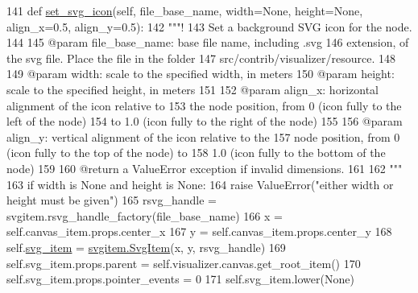 \begin{DoxyCode}
141     \textcolor{keyword}{def }\hyperlink{classvisualizer_1_1core_1_1Node_a308c7317a292873bfeb648b1ca1a839e}{set\_svg\_icon}(self, file\_base\_name, width=None, height=None, align\_x=0.5, align\_y=0.5):
142         \textcolor{stringliteral}{"""!}
143 \textcolor{stringliteral}{        Set a background SVG icon for the node.}
144 \textcolor{stringliteral}{}
145 \textcolor{stringliteral}{        @param file\_base\_name: base file name, including .svg}
146 \textcolor{stringliteral}{        extension, of the svg file.  Place the file in the folder}
147 \textcolor{stringliteral}{        src/contrib/visualizer/resource.}
148 \textcolor{stringliteral}{        }
149 \textcolor{stringliteral}{        @param width: scale to the specified width, in meters}
150 \textcolor{stringliteral}{        @param height: scale to the specified height, in meters}
151 \textcolor{stringliteral}{}
152 \textcolor{stringliteral}{        @param align\_x: horizontal alignment of the icon relative to}
153 \textcolor{stringliteral}{        the node position, from 0 (icon fully to the left of the node)}
154 \textcolor{stringliteral}{        to 1.0 (icon fully to the right of the node)}
155 \textcolor{stringliteral}{}
156 \textcolor{stringliteral}{        @param align\_y: vertical alignment of the icon relative to the}
157 \textcolor{stringliteral}{        node position, from 0 (icon fully to the top of the node) to}
158 \textcolor{stringliteral}{        1.0 (icon fully to the bottom of the node)}
159 \textcolor{stringliteral}{}
160 \textcolor{stringliteral}{        @return a ValueError exception if invalid dimensions.}
161 \textcolor{stringliteral}{}
162 \textcolor{stringliteral}{        """}
163         \textcolor{keywordflow}{if} width \textcolor{keywordflow}{is} \textcolor{keywordtype}{None} \textcolor{keywordflow}{and} height \textcolor{keywordflow}{is} \textcolor{keywordtype}{None}:
164             \textcolor{keywordflow}{raise} ValueError(\textcolor{stringliteral}{"either width or height must be given"})
165         rsvg\_handle = svgitem.rsvg\_handle\_factory(file\_base\_name)
166         x = self.canvas\_item.props.center\_x
167         y = self.canvas\_item.props.center\_y
168         self.\hyperlink{classvisualizer_1_1core_1_1Node_a8fc37475251336b56578ff3a5d437ba3}{svg\_item} = \hyperlink{classvisualizer_1_1svgitem_1_1SvgItem}{svgitem.SvgItem}(x, y, rsvg\_handle)
169         self.svg\_item.props.parent = self.visualizer.canvas.get\_root\_item()
170         self.svg\_item.props.pointer\_events = 0
171         self.svg\_item.lower(\textcolor{keywordtype}{None})

\end{DoxyCode}
